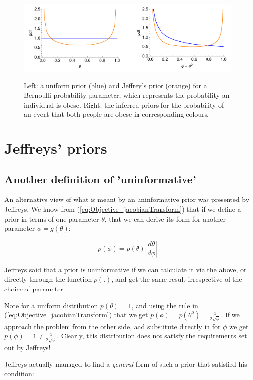 \documentclass[11pt,fullpage]{book}
\begin{document}
\begin{figure}
\centering
\scalebox{0.4} 
{\includegraphics{Objective_uniformPrior.pdf}}
\caption{Left: a uniform prior (blue) and Jeffrey's prior (orange) for a Bernoulli probability parameter, which represents the probability an individual is obese. Right: the inferred priors for the probability of an event that both people are obese in corresponding colours.}\label{fig:Objective_uniformPrior}
\end{figure}

\section{Jeffreys' priors}
\subsection{Another definition of 'uninformative'}
An alternative view of what is meant by an uninformative prior was presented by Jeffreys. We know from (\ref{eq:Objective_jacobianTransform}) that if we define a prior in terms of one parameter $\theta$, that we can derive its form for another parameter $\phi = g(\theta)$:

\begin{equation}
p(\phi) = p(\theta)|\frac{d\theta}{d\phi}|
\end{equation}

Jeffreys said that a prior is uninformative if we can calculate it via the above, or directly through the function $p(.)$, and get the same result irrespective of the choice of parameter.

Note for a uniform distribution $p(\theta)=1$, and using the rule in (\ref{eq:Objective_jacobianTransform}) that we get $p(\phi)=p(\theta^2)=\frac{1}{2\sqrt{\phi}}$. If we approach the problem from the other side, and substitute directly in for $\phi$ we get $p(\phi)=1\neq \frac{1}{2\sqrt{\phi}}$. Clearly, this distribution does not satisfy the requirements set out by Jeffreys!

Jeffreys actually managed to find a \textit{general} form of such a prior that satisfied his condition:
\end{document}
